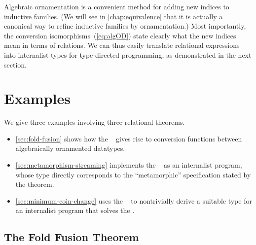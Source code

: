 Algebraic ornamentation is a convenient method for adding new indices to inductive families.
(We will see in \autoref{chap:equivalence} that it is actually a canonical way to refine inductive families by ornamentation.)
Most importantly, the conversion isomorphisms~(\ref{eq:algOD}) state clearly what the new indices mean in terms of relations.
We can thus easily translate relational expressions into internalist types for type-directed programming, as demonstrated in the next section.

\section{Examples}
\label{sec:internalism-examples}

We give three examples involving three relational theorems.
\begin{itemize}
\item \autoref{sec:fold-fusion} shows how the ~\citep[Section~6.2]{Bird-AoP} gives rise to conversion functions between algebraically ornamented datatypes.
\item \autoref{sec:metamorphism-streaming} implements the ~\citep[Theorem~30]{Bird-arithmetic-coding} as an internalist program, whose type directly corresponds to the ``metamorphic'' specification stated by the theorem.
\item \autoref{sec:minimum-coin-change} uses the ~\citep[Theorem~10.1]{Bird-AoP} to nontrivially derive a suitable type for an internalist program that solves the .
\end{itemize}

\subsection{The Fold Fusion Theorem}
\label{sec:fold-fusion}

